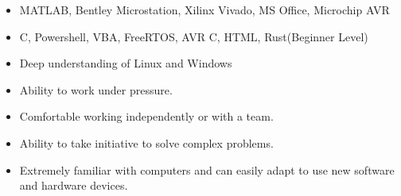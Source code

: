 \begin{itemize}
\item MATLAB, Bentley Microstation, Xilinx Vivado, MS Office, Microchip AVR
\item C, Powershell, VBA, FreeRTOS, AVR C, HTML, Rust(Beginner Level)
\item Deep understanding of Linux and Windows
\end{itemize}

\begin{itemize}
\item Ability to work under pressure.
\item Comfortable working independently or with a team.
\item Ability to take initiative to solve complex problems.
\item Extremely familiar with computers and can easily adapt to use new software and hardware devices.
\end{itemize}